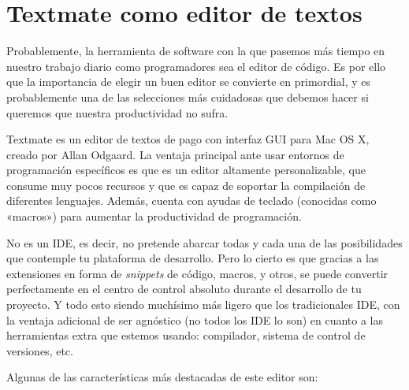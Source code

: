 \section{Textmate como editor de textos} %
  \label{sec:textmate_como_editor_de_textos}
  
  Probablemente, la herramienta de software con la que pasemos más tiempo en nuestro trabajo diario como programadores sea el editor de código. Es por ello que la importancia de elegir un buen editor se convierte en primordial, y es probablemente una de las selecciones más cuidadosas que debemos hacer si queremos que nuestra productividad no sufra.

  Textmate es un editor de textos de pago con interfaz GUI para Mac OS X, creado por Allan Odgaard. La ventaja principal ante usar entornos de programación específicos es que es un editor altamente personalizable, que consume muy pocos recursos y que es capaz de soportar la compilación de diferentes lenguajes. Además, cuenta con ayudas de teclado (conocidas como «macros») para aumentar la productividad de programación. 

  No es un IDE, es decir, no pretende abarcar todas y cada una de las posibilidades que contemple tu plataforma de desarrollo. Pero lo cierto es que gracias a las extensiones en forma de {\it snippets} de código, macros, y otros, se puede convertir perfectamente en el centro de control absoluto durante el desarrollo de tu proyecto. Y todo esto siendo muchísimo más ligero que los tradicionales IDE, con la ventaja adicional de ser agnóstico (no todos los IDE lo son) en cuanto a las herramientas extra que estemos usando: compilador, sistema de control de versiones, etc.  

  Algunas de las características más destacadas de este editor son:
  
